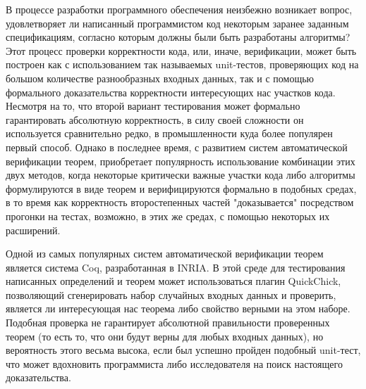




\newcommand{\tbttr}{BT\_tr}
\newcommand{\tcoq}{\texttt{Coq}~}
\newcommand{\tqc}{\texttt{QuickChick}~}



\Intro

В процессе разработки программного обеспечения неизбежно возникает вопрос, удовлетворяет ли написанный программистом код некоторым заранее заданным спецификациям, согласно которым должны были быть разработаны алгоритмы? Этот процесс проверки корректности кода, или, иначе, верификации, может быть построен как с использованием так называемых unit-тестов, проверяющих код на большом количестве разнообразных входных данных, так и с помощью формального доказательства корректности интересующих нас участков кода. Несмотря на то, что второй вариант тестирования может формально гарантировать абсолютную корректность, в силу своей сложности он используется сравнительно редко, в промышленности куда более популярен первый способ. Однако в последнее время, с развитием систем автоматической верификации теорем, приобретает популярность использование комбинации этих двух методов, когда некоторые критически важные участки кода либо алгоритмы формулируются в виде теорем и верифицируются формально в подобных средах, в то время как корректность второстепенных частей "доказывается" посредством прогонки на тестах, возможно, в этих же средах, с помощью некоторых их расширений.

Одной из самых популярных систем автоматической верификации теорем является система Coq, разработанная в INRIA. В этой среде для тестирования написанных определений и теорем может использоваться плагин QuickChick, позволяющий сгенерировать набор случайных входных данных и проверить, является ли интересующая нас теорема либо свойство верными на этом наборе. Подобная проверка не гарантирует абсолютной правильности проверенных теорем (то есть то, что они будут верны для любых входных данных), но вероятность этого весьма высока, если был успешно пройден подобный unit-тест, что может вдохновить программиста либо исследователя на поиск настоящего доказательства.


